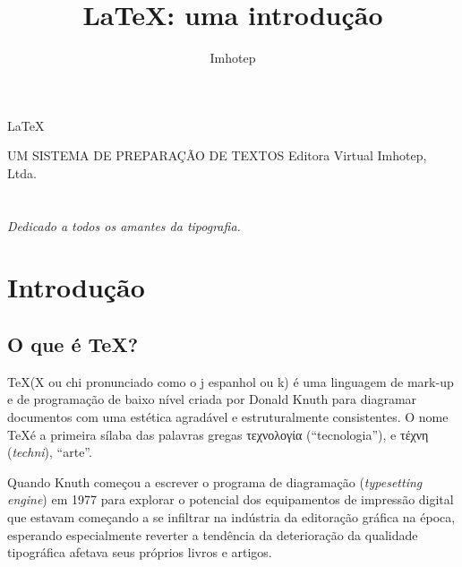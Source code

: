 \documentclass[a4paper,nols,bidi]{tufte-book}
\title{LaTeX: uma introdução}
\author{Imhotep}
\begin{document}

\frenchspacing


\begin{titlepage}
\phantom{xxx}
\vfill
\centering
\fontsize{70}{80}\selectfont\LaTeX\par
\vspace{2cm}
\centering
\LARGE
UM SISTEMA DE PREPARAÇÃO DE TEXTOS
\vfill
\LARGE
Editora Virtual Imhotep, Ltda.
\end{titlepage}

\restoregeometry


\chapter*{}
\thispagestyle{empty}
\phantom{}
\vfill
{\large \emph{Dedicado a todos os amantes da tipografia.}}
\vfill
\cleardoublepage

\tableofcontents

\listoffigures

\listoftables

\chapter{Introdução}

\section{O que é TeX?}
\TeX (X ou chi pronunciado como o j espanhol ou k) é uma linguagem de mark-up e de programação de baixo nível criada por Donald Knuth para diagramar documentos com uma estética agradável e estruturalmente consistentes. O nome \TeX é a primeira sílaba das palavras gregas \textgreek{τεχνολογία} (``tecnologia''), e \textgreek{τέχνη} (\textit{techni}), ``arte''.
	
Quando Knuth começou a escrever o programa de diagramação (\textit{typesetting engine}) em 1977 para explorar o potencial dos equipamentos de impressão digital que estavam começando a se infiltrar na indústria da editoração gráfica na época, esperando especialmente reverter a tendência da deterioração da qualidade tipográfica afetava seus próprios livros e artigos.
\end{document}
